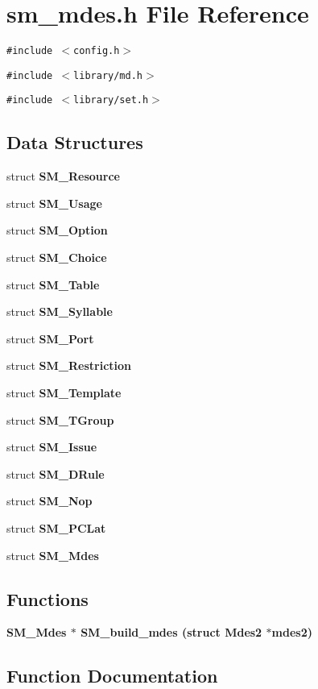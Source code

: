 \section{sm\_\-mdes.h File Reference}
\label{sm__mdes_8h}
{\tt \#include $<$config.h$>$}\par
{\tt \#include $<$library/md.h$>$}\par
{\tt \#include $<$library/set.h$>$}\par
\subsection*{Data Structures}
\begin{CompactItemize}
\item 
struct \bf{SM\_\-Resource}
\item 
struct \bf{SM\_\-Usage}
\item 
struct \bf{SM\_\-Option}
\item 
struct \bf{SM\_\-Choice}
\item 
struct \bf{SM\_\-Table}
\item 
struct \bf{SM\_\-Syllable}
\item 
struct \bf{SM\_\-Port}
\item 
struct \bf{SM\_\-Restriction}
\item 
struct \bf{SM\_\-Template}
\item 
struct \bf{SM\_\-TGroup}
\item 
struct \bf{SM\_\-Issue}
\item 
struct \bf{SM\_\-DRule}
\item 
struct \bf{SM\_\-Nop}
\item 
struct \bf{SM\_\-PCLat}
\item 
struct \bf{SM\_\-Mdes}
\end{CompactItemize}
\subsection*{Functions}
\begin{CompactItemize}
\item 
\bf{SM\_\-Mdes} $\ast$ \bf{SM\_\-build\_\-mdes} (struct \bf{Mdes2} $\ast$mdes2)
\end{CompactItemize}


\subsection{Function Documentation}
